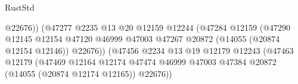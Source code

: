 \begin{lexlean}{RustStd}
\begin{coremodule}
                                                              @22676))
                                                          (@47277
                                                            @2235
                                                            @13
                                                            @20
                                                            @12159
                                                            @12244
                                                            (@47284
                                                              @12159
                                                              (@47290
                                                                @12145
                                                                @12154
                                                                @47120
                                                                @46999
                                                                @47003
                                                                @47267
                                                                @20872
                                                                (@14055 (@20874 @12154 @12146))
                                                                @22676))
                                                            (@47456
                                                              @2234
                                                              @13
                                                              @19
                                                              @12179
                                                              @12243
                                                              (@47463
                                                                @12179
                                                                (@47469
                                                                  @12164
                                                                  @12174
                                                                  @47474
                                                                  @46999
                                                                  @47003
                                                                  @47384
                                                                  @20872
                                                                  (@14055 (@20874 @12174 @12165))
                                                                  @22676))

\end{coremodule}
\end{lexlean}
